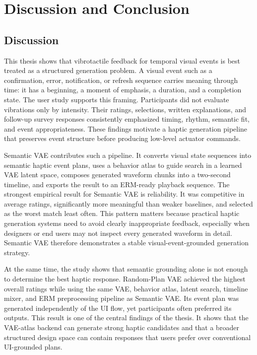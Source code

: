 \chapter{Discussion and Conclusion}

\section{Discussion}

This thesis shows that vibrotactile feedback for temporal visual events is best treated as a structured generation problem. A visual event such as a confirmation, error, notification, or refresh sequence carries meaning through time: it has a beginning, a moment of emphasis, a duration, and a completion state. The user study supports this framing. Participants did not evaluate vibrations only by intensity. Their ratings, selections, written explanations, and follow-up survey responses consistently emphasized timing, rhythm, semantic fit, and event appropriateness. These findings motivate a haptic generation pipeline that preserves event structure before producing low-level actuator commands.

Semantic VAE contributes such a pipeline. It converts visual state sequences into semantic haptic event plans, uses a behavior atlas to guide search in a learned VAE latent space, composes generated waveform chunks into a two-second timeline, and exports the result to an ERM-ready playback sequence. The strongest empirical result for Semantic VAE is reliability. It was competitive in average ratings, significantly more meaningful than weaker baselines, and selected as the worst match least often. This pattern matters because practical haptic generation systems need to avoid clearly inappropriate feedback, especially when designers or end users may not inspect every generated waveform in detail. Semantic VAE therefore demonstrates a stable visual-event-grounded generation strategy.

At the same time, the study shows that semantic grounding alone is not enough to determine the best haptic response. Random-Plan VAE achieved the highest overall ratings while using the same VAE, behavior atlas, latent search, timeline mixer, and ERM preprocessing pipeline as Semantic VAE. Its event plan was generated independently of the UI flow, yet participants often preferred its outputs. This result is one of the central findings of the thesis. It shows that the VAE-atlas backend can generate strong haptic candidates and that a broader structured design space can contain responses that users prefer over conventional UI-grounded plans.

